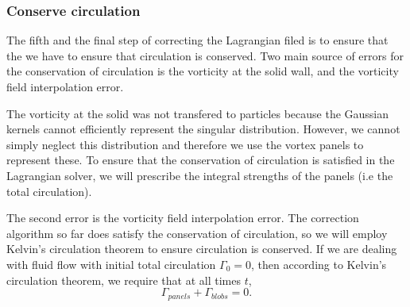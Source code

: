 \subsubsection*{Conserve circulation}
\label{subsubsec:cc}
The fifth and the final step of correcting the Lagrangian filed is to ensure that the we have to ensure that circulation is conserved. Two main source of errors for the conservation of circulation is the vorticity at the solid wall, and the vorticity field interpolation error.

The vorticity at the solid was not transfered to particles because the Gaussian kernels cannot efficiently represent the singular distribution. However, we cannot simply neglect this distribution and therefore we use the vortex panels to represent these. To ensure that the conservation of circulation is satisfied in the Lagrangian solver, we will prescribe the integral strengths of the panels (i.e the total circulation).

The second error is the vorticity field interpolation error. The correction algorithm so far does satisfy the conservation of circulation, so we will employ Kelvin's circulation theorem to ensure circulation is conserved. If we are dealing with fluid flow with initial total circulation $\Gamma_0 = 0$, then according to Kelvin's circulation theorem, we require that at all times $t$,
\begin{equation}
\Gamma_{panels} + \Gamma_{blobs} = 0.
\end{equation}

